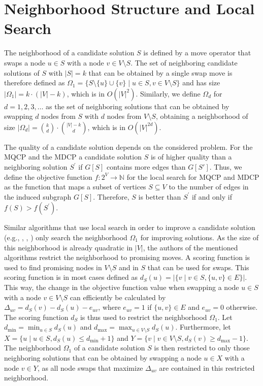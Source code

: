 \documentclass[draft,final]{vutinfth} %
\begin{document}
\section{Neighborhood Structure and Local Search} \label{sec:neighborhood-structure}

The neighborhood of a candidate solution $S$ is defined by a move operator that swaps a node $u \in S$ with a node $v \in V \setminus S$. The set of neighboring candidate solutions of $S$ with $|S| = k$ that can be obtained by a single swap move is therefore defined as $\Omega_1 = \{ S \setminus \{u\} \cup \{v\} \mid u \in S, v \in V \setminus S \}$ and has size $|\Omega_1| = k \cdot (|V|-k)$, which is in $O(|V|^2)$. Similarly, we define $\Omega_d$ for $d=1,2,3,\dots$ as the set of neighboring solutions that can be obtained by swapping $d$ nodes from $S$ with $d$ nodes from $V \setminus S$, obtaining a neighborhood of size $|\Omega_d| = \binom{k}{d} \cdot \binom{|V|-k}{d}$, which is in $O(|V|^{2d})$. 


The quality of a candidate solution depends on the considered problem. For the MQCP and the MDCP a candidate solution $S$ is of higher quality than a neighboring solution $S^\prime$ if $G[S]$ contains more edges than $G[S']$. Thus, we define the objective function $f \colon 2^V \rightarrow \mathbb{N}$ for the local search for MQCP and MDCP as the function that maps a subset of vertices $S \subseteq V$ to the number of edges in the induced subgraph $G[S]$. Therefore, $S$ is better than $S^\prime$ if and only if $f(S) > f(S^\prime)$. 

Similar algorithms that use local search in order to improve a candidate solution (e.g.,  \cite{chen_nuqclq_2021}, \cite{djeddi_extension_2019}, \cite{zhou_opposition-based_2020}) only search the neighborhood $\Omega_1$ for improving solutions. As the size of this neighborhood is already quadratic in $|V|$, the authors of the mentioned algorithms restrict the neighborhood to promising moves. A scoring function is used to find promising nodes in $V \setminus S$ and in $S$ that can be used for swaps. This scoring function is in most cases defined as $d_S(u) = |\{v \mid v \in S, \{u,v\} \in E \}|$. This way, the change in the objective function value when swapping a node $u \in S$ with a node $v \in V \setminus S$ can efficiently be calculated by $\Delta_{uv} = d_S(v) - d_S(u) - e_{uv}$, where $e_{uv} = 1$ if $\{u,v\} \in E$ and $e_{uv} = 0$ otherwise. 
The scoring function $d_S$ is thus used to restrict the neighborhood $\Omega_1$. 
Let $d_{\min} = \min_{u \in S} d_S(u)$ and $d_{\max} = \max_{u \in V \setminus S} d_S(u)$.
Furthermore, let $X = \{ u \mid u \in S, d_S(u) \leq d_{\min} + 1 \}$ and $Y = \{ v \mid v \in V \setminus S, d_S(v) \geq d_{\max} - 1 \}$. The neighborhood $\Omega_1$ of a candidate solution $S$ is then restricted to only those neighboring solutions that can be obtained by swapping a node $u \in X$ with a node $v \in Y$, as all node swaps that maximize $\Delta_{uv}$ are contained in this restricted neighborhood. 
\end{document}
